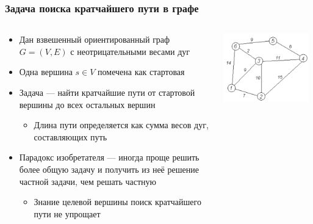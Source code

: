 \documentclass[xetex,mathserif,serif]{beamer}
\begin{document}
	\begin{frame}
		\frametitle{Задача поиска кратчайшего пути в графе}
		\begin{columns}
			\begin{column}{0.65\textwidth}
				\begin{itemize}
					\item Дан взвешенный ориентированный граф $G = (V, E)$ с неотрицательными весами дуг
					\item Одна вершина $s \in V$ помечена как стартовая
					\item Задача --- найти кратчайшие пути от стартовой вершины до всех остальных вершин
					\begin{itemize}
						\item Длина пути определяется как сумма весов дуг, составляющих путь
					\end{itemize}
					\item Парадокс изобретателя --- иногда проще решить более общую задачу и получить из неё решение частной задачи, чем решать частную
					\begin{itemize}
						\item Знание целевой вершины поиск кратчайшего пути не упрощает
					\end{itemize}
				\end{itemize}
			\end{column}
			\begin{column}{0.35\textwidth}
				\begin{center}
					\includegraphics[width=0.95\textwidth]{shortest-path.png}
				\end{center}
			\end{column}
		\end{columns}
	\end{frame}
\end{document}
